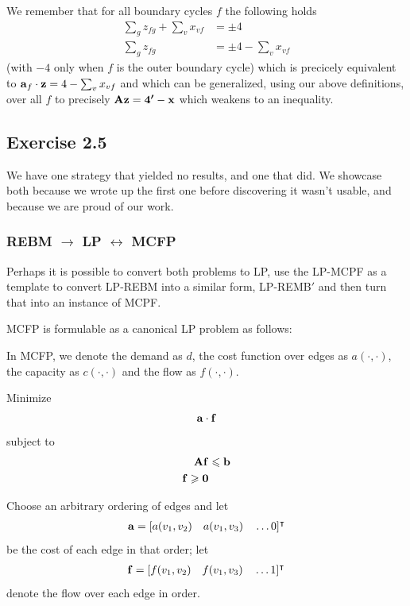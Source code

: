 We remember that for all boundary cycles $f$ the following holds
\begin{align*}
  \sum_g z_{fg} + \sum_v x_{vf} &= \pm 4 \\
  \sum_g z_{fg} &= \pm 4 - \sum_v x_{vf}
\end{align*}
(with $-4$ only when $f$ is the outer boundary cycle)
which is precicely equivalent to $\bm{\mathrm{a}}_f \cdot \bm{\mathrm{z}} = 4 - \sum_v x_{vf}$
and which can be generalized, using our above definitions, over all $f$ to precisely
$\bm{\mathrm{A}} \bm{\mathrm{z}} = \bm{\mathrm{4'}} - \bm{\mathrm{x}}$ which weakens to an inequality.

\subsection{Exercise 2.5}

We have one strategy that yielded no results, and one that did. We showcase
both because we wrote up the first one before discovering it wasn't usable,
and because we are proud of our work.

\subsubsection{REBM $\to$ LP $\leftrightarrow$ MCFP}

Perhaps it is possible to convert both problems to LP, use the
LP-MCPF as a template to convert LP-REBM into a similar form, LP-REMB$\prime$
and then turn that into an instance of MCPF.

MCFP is formulable as a canonical LP problem as follows:

In MCFP, we denote the demand as $d$, the cost function over edges as $a(\cdot,\cdot)$, the
capacity as $c(\cdot,\cdot)$ and the flow as $f(\cdot, \cdot)$.

Minimize
\begin{align*}
  \bm{\mathrm{a}} \cdot \bm{\mathrm{f}}
\end{align*}
subject to
\begin{align*}
  \bm{\mathrm{A}} \bm{\mathrm{f}} &\leqslant \bm{\mathrm{b}} \\
  \bm{\mathrm{f}} \geqslant \bm{\mathrm{0}}
\end{align*}

Choose an arbitrary ordering of edges and let
\begin{align*}
  \bm{\mathrm{a}} = [a(v_1,v_2)\quad a(v_1,v_3) \quad \dots 0]^\intercal
\end{align*}
be the cost of each edge in that order; let
\begin{align*}
  \bm{\mathrm{f}} = [f(v_1, v_2)\quad f(v_1,v_3) \quad \dots 1]^\intercal
\end{align*}
denote the flow over each edge in order.

